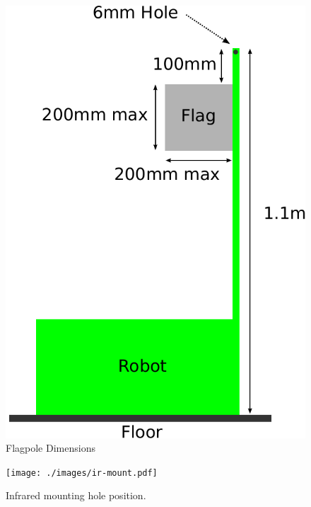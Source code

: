 \begin{figure}
 \begin{center}
  \includegraphics[keepaspectratio, scale =0.7]{./images/flag-2011.pdf}
  \caption{\label{fig:flag}Flagpole Dimensions}
 \end{center}
\end{figure}

\begin{figure}
 \begin{center}
  \texttt{[image: ./images/ir-mount.pdf]}
  \caption{\label{fig:ir-mount}Infrared mounting hole position.}
 \end{center}
\end{figure}

\clearpage
